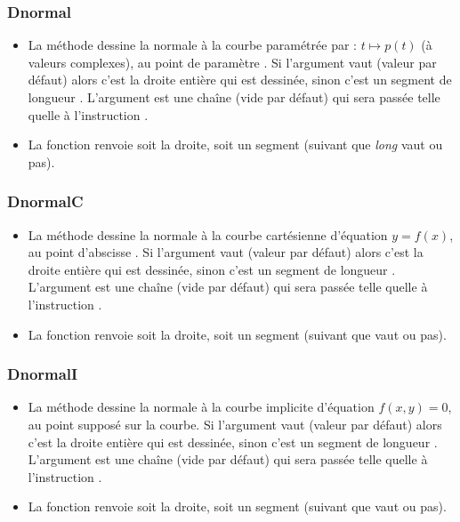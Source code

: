 \subsubsection{Dnormal}
\begin{itemize}
    \item La méthode  dessine la normale à la courbe paramétrée par : \(t \mapsto p(t)\) (à valeurs complexes), au point de paramètre . Si l'argument  vaut \nil (valeur par défaut) alors c'est la droite entière qui est dessinée, sinon c'est un segment de longueur . L'argument  est une chaîne (vide par défaut) qui sera passée telle quelle à l'instruction \drawcmd.
    \item La fonction  renvoie soit la droite, soit un segment (suivant que \emph{long} vaut \nil ou pas).
\end{itemize}

\subsubsection{DnormalC}
\begin{itemize}
    \item La méthode  dessine la normale à la courbe cartésienne d'équation \(y=f(x)\), au point d'abscisse . Si l'argument  vaut \nil (valeur par défaut) alors c'est la droite entière qui est dessinée, sinon c'est un segment de longueur . L'argument  est une chaîne (vide par défaut) qui sera passée telle quelle à l'instruction \drawcmd.
    \item La fonction  renvoie soit la droite, soit un segment (suivant que  vaut \nil ou pas).
\end{itemize}

\subsubsection{DnormalI}
\begin{itemize}
    \item La méthode  dessine la normale à la courbe implicite d'équation \(f(x,y)=0\), au point  supposé sur la courbe. Si l'argument  vaut \nil (valeur par défaut) alors c'est la droite entière qui est dessinée, sinon c'est un segment de longueur . L'argument  est une chaîne (vide par défaut) qui sera passée telle quelle à l'instruction \drawcmd.
    \item La fonction  renvoie soit la droite, soit un segment (suivant que  vaut \nil ou pas).
\end{itemize}
  

